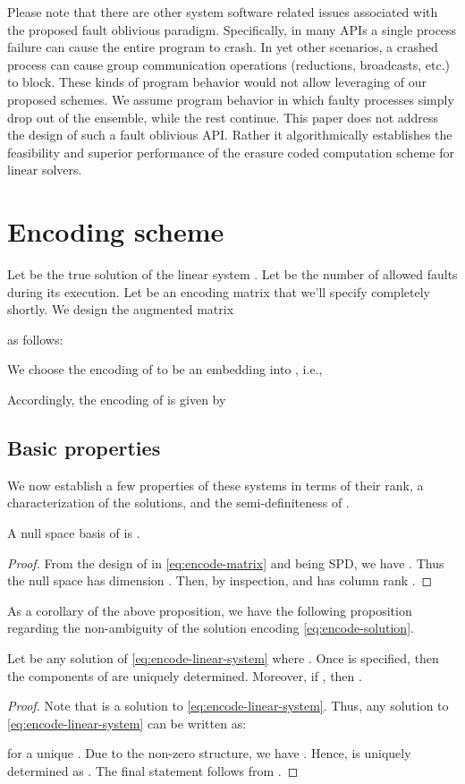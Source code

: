 \documentclass[11pt]{article}
\begin{document}
Please note that there are other system software related issues
associated with the proposed fault oblivious paradigm. Specifically, in many APIs a
single process failure can cause the entire program to crash. In yet
other scenarios, a crashed process can cause group communication operations
(reductions, broadcasts, etc.) to block. These kinds of program behavior would not allow
leveraging of our proposed schemes. We assume program behavior
in which faulty processes simply drop out of the ensemble, while the rest continue.
This paper does not address the design of such a fault oblivious API. Rather
it algorithmically establishes the feasibility and superior performance of
the erasure coded computation scheme for linear solvers.


\section{Encoding scheme} \label{sec:encoding}

Let  be the true solution of the linear system .
Let  be the number of allowed faults during its execution.
Let  be an encoding matrix that we'll
specify completely shortly. We design the augmented matrix

as follows:

We choose the encoding of  to be an embedding into , i.e.,

Accordingly, the encoding of  is given by


\subsection{Basic properties}

We now establish a few properties of these systems in terms of their rank,
a characterization of the solutions, and the semi-definiteness of .

\begin{proposition} A null space basis of  is .
\label{prop:null-space-basis}
\end{proposition}
\begin{proof}
From the design of  in \eqref{eq:encode-matrix} and  being SPD, we have . Thus the null space has dimension . Then, by inspection,  and  has column rank .
\end{proof}

As a corollary of the above proposition, we have the following proposition regarding the non-ambiguity of the solution encoding \eqref{eq:encode-solution}.
\begin{proposition}
Let  be any solution of \eqref{eq:encode-linear-system} where . Once  is specified, then the components of  are uniquely determined. Moreover, if , then .
\label{prop:non-ambiguity}
\end{proposition}
\begin{proof}
Note that  is a solution to \eqref{eq:encode-linear-system}. Thus, any solution to \eqref{eq:encode-linear-system} can be written as: 

for a unique . Due to the non-zero structure, we have . Hence,  is uniquely determined as . The final statement follows from .
\end{proof}
\end{document}
